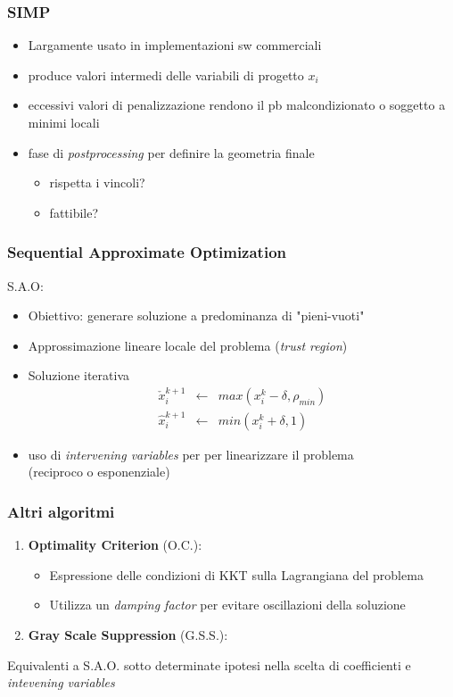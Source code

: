 \documentclass{beamer}
\begin{document}
\begin{frame}
	\frametitle{SIMP}
	\begin{itemize}
		\item Largamente usato in implementazioni sw commerciali
		\item produce valori intermedi delle variabili di progetto $x_i$
		\item eccessivi valori di penalizzazione rendono il pb malcondizionato o soggetto a minimi locali
		\item fase di \textit{postprocessing} per definire la geometria finale
		\begin{itemize}
			\item rispetta i vincoli?
			\item fattibile?
		\end{itemize}
	\end{itemize}
\end{frame}



\begin{frame}
	\frametitle{Sequential Approximate Optimization}
	S.A.O: \cite{haftka2012elements}
	\begin{itemize}
		\item Obiettivo: generare soluzione a predominanza di "pieni-vuoti"
		\item Approssimazione lineare locale del problema (\textit{trust region})
		\item Soluzione iterativa
			\begin{eqnarray}
			\check{x}^{k+1}_i & \leftarrow & max(x^{k}_i - \delta, \rho_{min}) \\
			\hat{x}^{k+1}_i & \leftarrow & min(x^{k}_i + \delta, 1)
			\end{eqnarray}
		\item uso di \textit{intervening variables} per per linearizzare il problema \\ (reciproco o esponenziale)
	\end{itemize}
	
	
\end{frame}


\begin{frame}
	\frametitle{Altri algoritmi}
	\begin{enumerate}
		\item \textbf{Optimality Criterion} (O.C.): \cite{bendsoe1989optimal}
		\begin{itemize}
			\item Espressione delle condizioni di KKT sulla Lagrangiana del problema
			\item Utilizza un \textit{damping factor} per evitare oscillazioni della soluzione
		\end{itemize}
		\item \textbf{Gray Scale Suppression} (G.S.S.): \cite{groenwold2009simple}
	\end{enumerate}

	Equivalenti a S.A.O. sotto determinate ipotesi nella scelta di coefficienti e \textit{intevening variables} 


\end{frame}
\end{document}
